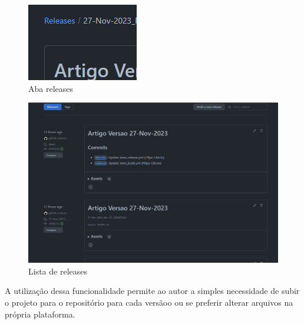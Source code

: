 \begin{figure}[ht]
	\centering
	\includegraphics[width=.5\textwidth]{./images/image08.png}
	\caption{Aba releases}
	\label{fig:image08}
\end{figure}


\begin{figure}[ht]
	\centering
	\includegraphics[width=.5\textwidth]{./images/image09.png}
	\caption{Lista de releases}
	\label{fig:image09}
\end{figure}

A utilização dessa funcionalidade permite ao autor a simples necessidade de subir o projeto para o repositório para cada versãoo ou se preferir alterar arquivos na própria plataforma.